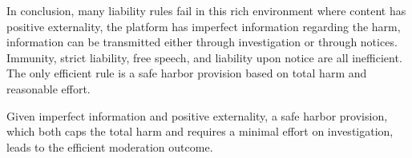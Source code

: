 
In conclusion, many liability rules fail in this rich environment where content has positive externality, the platform has imperfect information regarding the harm, information can be transmitted either through investigation or through notices. Immunity, strict liability, free speech, and liability upon notice are all inefficient. The only efficient rule is a safe harbor provision based on total harm and reasonable effort.

\begin{proposition}
Given imperfect information and positive externality, a safe harbor provision, which both caps the total harm and requires a minimal effort on investigation, leads to the efficient moderation outcome. 
\end{proposition}